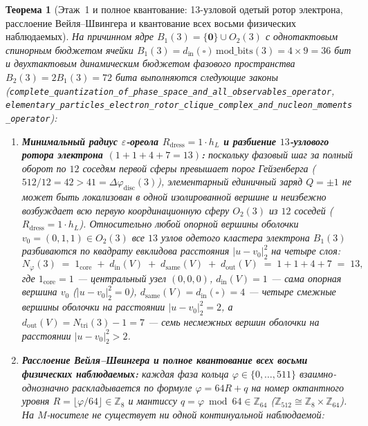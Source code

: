 \documentclass[11pt,a4paper]{article}
\theoremstyle{plain}
\newtheorem{theorem}{Теорема}[section]
\theoremstyle{definition}
\begin{document}
\begin{theorem}[Этаж~1 и полное квантование: 13-узловой одетый ротор электрона, расслоение Вейля--Швингера и квантование всех восьми физических наблюдаемых]
\label{thm:electron-rotor-complete-quantization}
На причинном ядре $B_1(3) = \{\mathbf{0}\}\cup O_2(3)$ с однотактовым спинорным бюджетом ячейки $B_1(3) = d_{\mathrm{in}}(\square)\,\mathrm{mod\_bits}(3) = 4\times 9 = 36$ бит и двухтактовым динамическим бюджетом фазового пространства $B_2(3) = 2 B_1(3) = 72$ бита выполняются следующие законы (\texttt{complete\_quantization\_of\_phase\_space\_and\_all\_observables\_operator}, \texttt{elementary\_particles\_electron\_rotor\_clique\_complex\_and\_nucleon\_moments\_operator}):
\begin{enumerate}[label=\textbf{(\arabic*)},leftmargin=*]
\item \textbf{Минимальный радиус $\varepsilon$-ореола $R_{\mathrm{dress}} = 1\cdot h_L$ и разбиение $13$-узлового ротора электрона $(1 + 1 + 4 + 7 = 13)$:}
  поскольку фазовый шаг за полный оборот по $12$ соседям первой сферы превышает порог Гейзенберга ($512/12 = 42 > 41 = \Delta\varphi_{\mathrm{disc}}(3)$), элементарный единичный заряд $Q = \pm 1$ не может быть локализован в одной изолированной вершине и неизбежно возбуждает всю первую координационную сферу $O_2(3)$ из $12$ соседей ($R_{\mathrm{dress}} = 1\cdot h_L$). Относительно любой опорной вершины оболочки $v_0 = (0, 1, 1) \in O_2(3)$ все $13$ узлов одетого кластера электрона $B_1(3)$ разбиваются по квадрату евклидова расстояния $|u - v_0|_2^2$ на четыре слоя:
  \begin{equation}
    \label{eq:electron-13-partition}
    N_\varphi(3) \;=\; 1_{\mathrm{core}} \;+\; d_{\mathrm{in}}(V) \;+\; d_{\mathrm{same}}(V) \;+\; d_{\mathrm{out}}(V) \;=\; 1 + 1 + 4 + 7 \;=\; 13,
  \end{equation}
  где $1_{\mathrm{core}} = 1$ --- центральный узел $(0,0,0)$, $d_{\mathrm{in}}(V) = 1$ --- сама опорная вершина $v_0$ ($|u - v_0|_2^2 = 0$), $d_{\mathrm{same}}(V) = d_{\mathrm{in}}(\square) = 4$ --- четыре смежные вершины оболочки на расстоянии $|u - v_0|_2^2 = 2$, а $d_{\mathrm{out}}(V) = N_{\mathrm{tri}}(3) - 1 = 7$ --- семь несмежных вершин оболочки на расстоянии $|u - v_0|_2^2 > 2$.
\item \textbf{Расслоение Вейля--Швингера и полное квантование всех восьми физических наблюдаемых:}
  каждая фаза кольца $\varphi \in \{0, \dots, 511\}$ взаимно-однозначно раскладывается по формуле $\varphi = 64 R + q$ на номер октантного уровня $R = \lfloor\varphi / 64\rfloor \in \mathbb{Z}_8$ и мантиссу $q = \varphi \bmod 64 \in \mathbb{Z}_{64}$ ($\mathbb{Z}_{512} \cong \mathbb{Z}_8 \times \mathbb{Z}_{64}$). На $M$-носителе не существует ни одной континуальной наблюдаемой:

\end{enumerate}
\end{theorem}
\end{document}
